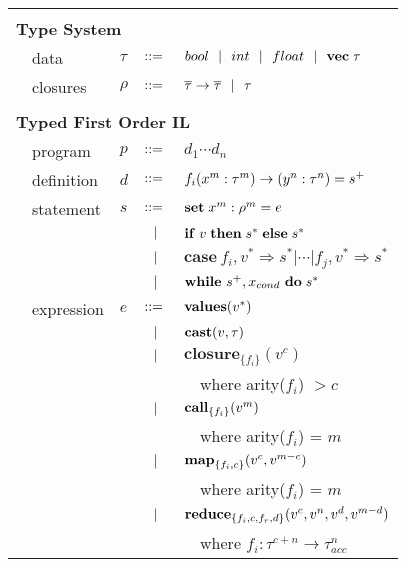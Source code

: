 \documentclass[preprint]{sigplanconf}
\begin{document}
\begin{figure}
  \begin{tabular}{| m{0.01cm}m{1.3cm}m{0.1cm}m{0.2cm}p{4.5cm} |}
  \hline
    & & & &\\
  \multicolumn{5}{|l|}{\textbf{Type System}} \\[4pt]
  & data     & $\tau$    & $::=$ & $bool \ \ | \ \  int \ \ | \ \  float \ \ | \ \  \mathbf{vec} \; \tau   $ \\[2pt]
  & closures        & $\rho$  & $::=$ & $\overline{\tau} \rightarrow \overline{\tau} \ \ | \ \   \tau$ \\[4pt]
  & & & &\\
   \multicolumn{5}{|l|}{\textbf{Typed First Order IL}}  \\[4pt]
  & program & $p$ &  $::=$   &  $d_1 \cdots d_n $ \\[4pt]
  & definition & $d$ & $::=$ & $f_i(x^m : \tau^m) \rightarrow (y^n : \tau^n) =s^{\small{+}}$ \\[4pt]
  & statement  & $s$ & $::=$ & $\mbox{\textbf{set}} \; x^m : \rho^m = e $\\[2pt]
  &            &     & $\ \ | \ \ $    & $\mbox{\textbf{if}} \;v\; \mbox{\textbf{then}} \;s^*\; \mbox{\textbf{else}} \;s^*$ \\[2pt]
  &            &     & $\ \ | \ \ $    & $\textbf{case} ~ f_i, v^* \Rightarrow s^* | \cdots | f_j, v^* \Rightarrow s^*   $ \\[2pt]
  &            &     & $\ \ | \ \ $    & $\mbox{\textbf{while}} ~s^+, x_{cond}~ \mbox{\textbf{do}} \;s^*\;  $ \\[4pt]
  & expression & $e$ & $::=$ & $\mbox{\textbf{values}}(v^*)$ \\[2pt]
  &            &     & $\ \ | \ \ $    & $\mbox{\textbf{cast}} (v, \tau)$ \\[2pt]
  &            &     & $\ \ | \ \ $    & $\textbf{closure} _{ \{f_i\}} (v^c) $ \\[2pt]
  &            &     &           & ~~where arity($f_i$) $ >  c$ \\[2pt]
  &            &     & $\ \ | \ \ $    & $\mbox{\textbf{call}} _{\{f_i \}} (v^m)$ \\[2pt] 
  &            &     &           & ~~where arity($f_i$) = $m$ \\[2pt]
  &            &     & $\ \ | \ \ $    & $\mbox{\textbf{map}} _{\{ f_i, c\}}(v^c, v^{m-c})$ \\[2pt]
  &            &     &           & ~~where arity($f_i$) = $m$ \\[2pt]
  &            &     & $\ \ | \ \ $    & $\mbox{\textbf{reduce}} _{\{ f_i, c, f_r, d \}} (v^{c}, v^n, v^{d}, v^{m-d})$ \\[2pt]
  &            &     &           & ~~where $f_i : \tau^{c+n} \rightarrow \tau^n_{acc}$ \\[2pt]

\end{tabular}
\end{figure}
\end{document}
